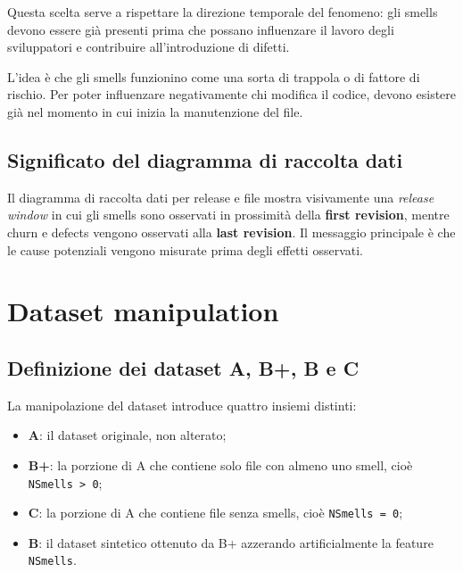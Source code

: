 Questa scelta serve a rispettare la direzione temporale del fenomeno: gli smells devono essere già presenti prima che possano influenzare il lavoro degli sviluppatori e contribuire all'introduzione di difetti.

\begin{notaprof}
L'idea è che gli smells funzionino come una sorta di trappola o di fattore di rischio. Per poter influenzare negativamente chi modifica il codice, devono esistere già nel momento in cui inizia la manutenzione del file.
\end{notaprof}

\subsection{Significato del diagramma di raccolta dati}

\begin{notaslide}
Il diagramma di raccolta dati per release e file mostra visivamente una \emph{release window} in cui gli smells sono osservati in prossimità della \textbf{first revision}, mentre churn e defects vengono osservati alla \textbf{last revision}. Il messaggio principale è che le cause potenziali vengono misurate prima degli effetti osservati.
\end{notaslide}

\section{Dataset manipulation}

\subsection{Definizione dei dataset A, B+, B e C}

La manipolazione del dataset introduce quattro insiemi distinti:

\begin{itemize}
    \item \textbf{A}: il dataset originale, non alterato;
    \item \textbf{B+}: la porzione di A che contiene solo file con almeno uno smell, cioè \texttt{NSmells > 0};
    \item \textbf{C}: la porzione di A che contiene file senza smells, cioè \texttt{NSmells = 0};
    \item \textbf{B}: il dataset sintetico ottenuto da B+ azzerando artificialmente la feature \texttt{NSmells}.
\end{itemize}

